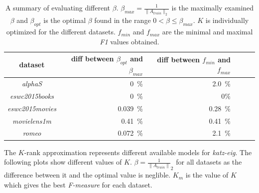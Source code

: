 \begin{table}[h!]
    \centering
    \begin{tabular}{| c | r | r | r | r | l |}
        \hline
        \textbf{dataset}        & \textbf{diff between $\beta_{opt}$ and $\beta_{max}$ }    & \textbf{diff between $f_{min}$ and $f_{max}$} \\ \hline

        \textit{alphaS}         & 0~\%      & 2.0~\%    \\ \hline
        \textit{eswc2015books}  & 0~\%      & 0\%       \\ \hline
        \textit{eswc2015movies} & 0.039~\%  & 0.28~\%   \\ \hline
        \textit{movielens1m}    & 0.41~\%   & 0.41~\%   \\ \hline
        \textit{romeo}          & 0.072~\%  & 2.1~\%    \\ \hline


    \end{tabular}
    \caption{A summary of evaluating different $\beta$. $\beta_{max} = \frac{1}{\|A_{train}\|_2}$ is the maximally examined $\beta$ and $\beta_{opt}$ is the optimal $\beta$ found in the range $0 < \beta \leq \beta_{max}$. $K$ is individually optimized for the different datasets. $f_{min}$ and $f_{max}$ are the minimal and maximal \textit{F1} values obtained.}
    \label{tab:katzeig_beta}
\end{table}

\FloatBarrier

\newpage


The $K$-rank approximation represents different available models for \textit{katz-eig}. The following plots show different values of $K$. $\beta = \frac{1}{\|A_{train}\|}_2$ for all datasets as the difference between it and the optimal value is neglible. $K_{m}$ is the value of $K$ which gives the best \textit{F-measure} for each dataset.

\FloatBarrier


